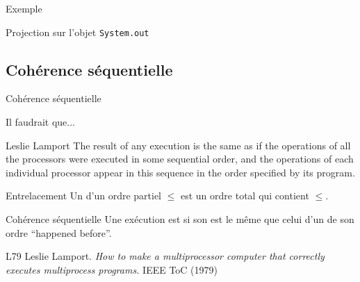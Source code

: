 \begin{frame}{Exemple}
\begin{block}{Projection sur l'objet \lstinline{System.out}}
\begin{center}
   \end{center}
\end{block}
\end{frame}

\subsection{Cohérence séquentielle}

\begin{frame}[fragile]{Cohérence séquentielle}

\begin{block}{Il faudrait que...}
    \begin{shadequote}{Leslie Lamport}
    The result of any execution is the same as if the operations of all the processors were executed in some sequential order,
    and the operations of each individual processor appear in this sequence in the order specified by its program.
   \end{shadequote}
\end{block}
  \vfill
\begin{block}{Entrelacement}
        Un  d'un ordre partiel $\le$ est un ordre total qui contient $\le$. 
\end{block}
\begin{block}{Cohérence séquentielle}
  Une exécution est  si son  est \alert{le même que} celui d'un  de son ordre ``happened before''.
\end{block}

\vfill
  \begin{citing}
  \item[L79] Leslie Lamport. \textit{How to make a multiprocessor computer that correctly executes multiprocess programs.} IEEE ToC (1979)
  \end{citing}
\end{frame}

